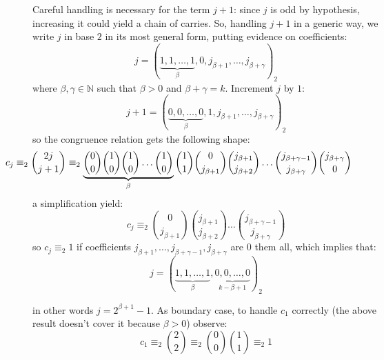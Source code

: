 \begin{itemize}
        Careful handling is necessary for the term $j+1$: 
        since $j$ is odd by hypothesis, increasing it could yield a chain of carries.
        So, handling $j+1$ in a generic way, we write
        $j$ in base $2$ in its most general form, putting evidence on coefficients:
        \begin{displaymath}
            j=\left(\underbrace{1,1,\ldots,1}_{\beta},0,j_{\beta+1},\ldots,j_{\beta+\gamma}\right)_{2}
        \end{displaymath}
        where $\beta,\gamma\in\mathbb{N}$ such that $\beta>0$ and $\beta+\gamma=k$. 
        Increment $j$ by $1$:
        \begin{displaymath}
            j+1=\left(\underbrace{0,0,\ldots,0}_{\beta},1,j_{\beta+1},\ldots,j_{\beta+\gamma}%
                \right)_{2}
        \end{displaymath}
        so the congruence relation gets the following shape:
        \begin{displaymath}
            \hspace{-2cm}
            c_{j}\equiv_{2}{{2j}\choose{j+1}}
                \equiv_{2} \underbrace{{{0}\choose{0}}{{1}\choose{0}}
                {{1}\choose{0}}\ldots{{1}\choose{0}}}_{\beta} 
                    {{1}\choose{1}}{{0}\choose{j_{\beta+1}}}{{j_{\beta+1}}\choose{j_{\beta+2}}}
                    \ldots{{j_{\beta+\gamma-1}}\choose{j_{\beta+\gamma}}}{{j_{\beta+\gamma}}\choose{0}}%
        \end{displaymath}
        a simplification yield:
        \begin{displaymath}
            c_{j}\equiv_{2} {{0}\choose{j_{\beta+1}}}
                {{j_{\beta+1}}\choose{j_{\beta+2}}}
                    \ldots{{j_{\beta+\gamma-1}}\choose{j_{\beta+\gamma}}}
        \end{displaymath}
        so $c_{j}\equiv_{2} 1$ if coefficients 
            $j_{\beta+1}, \ldots, j_{\beta+\gamma-1},j_{\beta+\gamma}$
        are $0$ them all, which implies that:
        \begin{displaymath}
            j=\left(\underbrace{1,1,\ldots,1}_{\beta},\underbrace{0,0,\ldots,0}_{k-\beta+1}\right)_{2}
        \end{displaymath}

        in other words $j = 2^{\beta+1}-1$. As boundary case, to handle $c_{1}$ correctly 
        (the above result doesn't cover it because $\beta>0$) observe:
        \begin{displaymath}
            c_{1}\equiv_{2} {{2}\choose{2}}\equiv_{2} {{0}\choose{0}}{{1}\choose{1}}\equiv_{2}1
        \end{displaymath}
\end{itemize}

